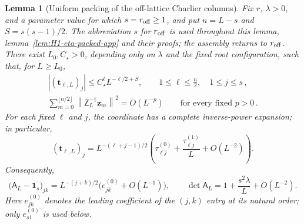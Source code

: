 \documentclass[a4paper,11pt]{article}
\newtheorem{lemma}[proposition]{Lemma}
\theoremstyle{definition}
\theoremstyle{remark}
\newcommand{\Id}{\mathbf 1}
\begin{document}
\begin{lemma}[Uniform packing of the off-lattice Charlier columns]
\label{lem:H1-packed-columns-app}
Fix \(r\), \(\lambda>0\), and a parameter value for which
\(s=r_{\rm off}\ge1\), and put \(n=L-s\) and
\(S=s(s-1)/2\). The abbreviation $s$ for $r_{\rm off}$ is used throughout this lemma,
lemma~\ref{lem:H1-eta-packed-app} and their proofs; the assembly returns to $r_{\rm off}$. There exist \(L_0,C_\star>0\), depending only on $\lambda$ and the
fixed root configuration, such that, for
\(L\ge L_0\),
\begin{equation}
\begin{gathered}
   |(\mathbf t_{\ell,L})_j|
   \le
   C_\star^\ell L^{-\ell/2+S},
   \qquad
   1\le\ell\le\frac{n}{2},\quad 1\le j\le s\,,\\
   \sum_{m=0}^{\lfloor n/2\rfloor}
   \left\|\mathsf Z_L^{-1}\mathbf z_m\right\|^2
   =O(L^{-p})
   \qquad\text{for every fixed }p>0\,.
\end{gathered}
   \label{eq:H1-terminal-column-bound-app}
\end{equation}
For each fixed \(\ell\) and \(j\), the coordinate has a complete
inverse-power expansion; in particular,
\begin{equation}
   (\mathbf t_{\ell,L})_j
   =L^{-(\ell+j-1)/2}
   \left(
      \tau_{\ell j}^{(0)}+
      \frac{\tau_{\ell j}^{(1)}}{L}+O(L^{-2})
   \right).
   \label{eq:H1-packed-column-fixed-expansion-app}
\end{equation}
Consequently,
\begin{equation}
   \bigl(\mathsf A_L-\Id_s\bigr)_{jk}
   =L^{-(j+k)/2}\bigl(e_{jk}^{(0)}+O(L^{-1})\bigr),\qquad
   \det\mathsf A_L
   =1+\frac{s^2\lambda}{L}+O(L^{-2}).
   \label{eq:H1-packed-Gram-expansion-app}
\end{equation}
Here $e_{jk}^{(0)}$ denotes the leading coefficient of the $(j,k)$ entry at its natural
order; only $e_{s1}^{(0)}$ is used below.
\end{lemma}
\end{document}
